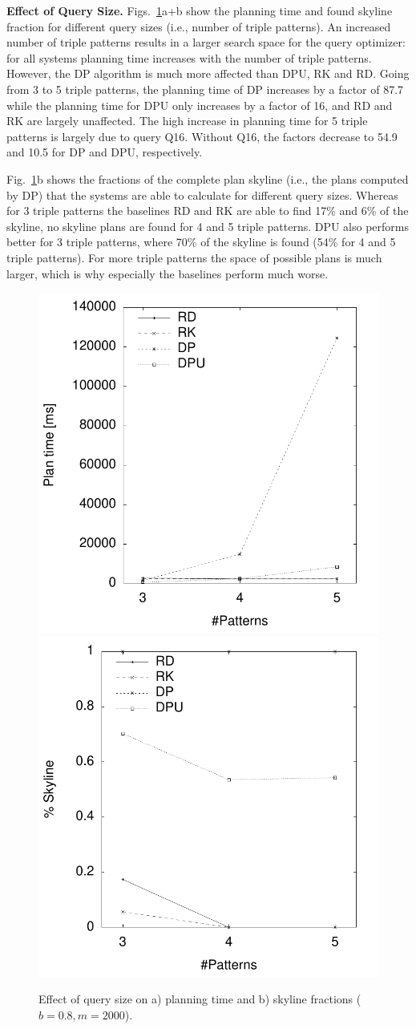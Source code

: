 \textbf{Effect of Query Size.} Figs.~\ref{fig:pareto_tp}a+b show the
planning time and found skyline fraction for different query sizes
(i.e., number of triple patterns). An increased number of triple
patterns results in a larger search space for the query optimizer: for
all systems planning time increases with the number of triple
patterns. However, the DP algorithm is much more affected than DPU, RK
and RD. Going from 3 to 5 triple patterns, the planning time of DP
increases by a factor of 87.7 while the planning time for DPU only
increases by a factor of 16, and RD and RK are largely unaffected. The
high increase in planning time for 5 triple patterns is largely due to
query Q16. Without Q16, the factors decrease to 54.9 and 10.5 for DP
and DPU, respectively.

Fig.~\ref{fig:pareto_tp}b shows the fractions of the complete plan
skyline (i.e., the plans computed by DP) that the systems are able to
calculate for different query sizes. Whereas for 3 triple patterns the
baselines RD and RK are able to find 17\% and 6\% of the skyline, no
skyline plans are found for 4 and 5 triple patterns. DPU also performs
better for 3 triple patterns, where 70\% of the skyline is found (54\%
for 4 and 5 triple patterns). For more triple patterns the space of
possible plans is much larger, which is why especially the baselines
perform much worse.

\begin{figure}[htb]
  \centering
  \includegraphics[width=0.49\linewidth]{figs/pareto_plan_tp.pdf}
  \includegraphics[width=0.49\linewidth]{figs/plans_skyline_by_tp.pdf}
  \caption{Effect of query size on a) planning time and b) skyline
    fractions ($b=0.8, m=2000$).}
  \label{fig:pareto_tp}
\end{figure}

